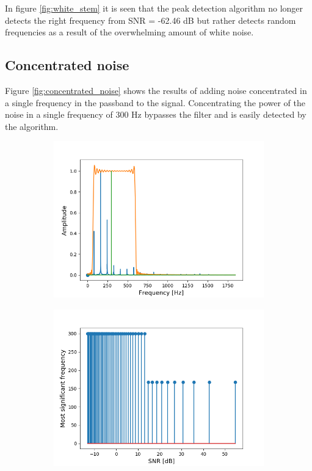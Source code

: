 In figure \ref{fig:white_stem} it is seen that the peak detection algorithm no longer detects the right frequency from SNR = -62.46 dB but rather detects random frequencies as a result of the overwhelming amount of white noise.

\subsection{Concentrated noise}
Figure \ref{fig:concentrated_noise} shows the results of adding noise concentrated in a single frequency in the passband to the signal. Concentrating the power of the noise in a single frequency of 300 Hz bypasses the filter and is easily detected by the algorithm.

\begin{figure}[H]
\begin{subfigure}{0.49\textwidth}
\centering
\includegraphics[width=\textwidth]{figures/SNR/concentrated_spectrum.png}
\caption{}
\label{fig:concentrated_spectrum}
\end{subfigure}
\begin{subfigure}{0.49\textwidth}
\centering
\includegraphics[width=\textwidth]{figures/SNR/concentrated_stem.png}

\end{subfigure}
\end{figure}
